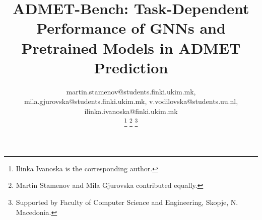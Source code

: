 \documentclass[journal]{IEEEtran}
\begin{document}
\title{ADMET-Bench: Task-Dependent Performance of GNNs and Pretrained Models in ADMET Prediction}

\author{



martin.stamenov@students.finki.ukim.mk, mila.gjurovska@students.finki.ukim.mk, v.vodilovska@students.uu.nl, ilinka.ivanoska@finki.ukim.mk

\thanks{Ilinka Ivanoska is the corresponding author.}
\thanks{Martin Stamenov and Mila Gjurovska contributed equally.}
\thanks{Supported by Faculty of Computer Science and Engineering, Skopje, N. Macedonia.}
}

\maketitle
\end{document}
